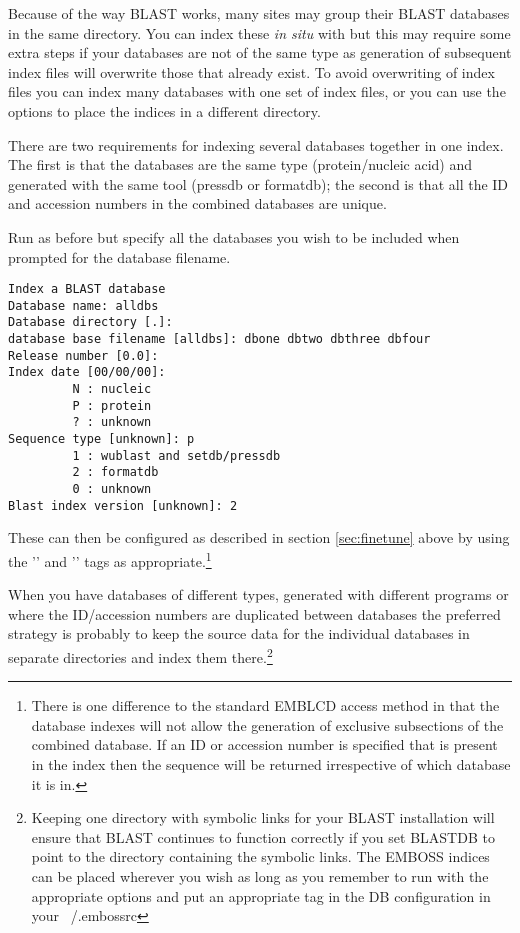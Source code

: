 \documentclass{report}
\begin{document}
Because of the way BLAST works, many sites may group their BLAST databases in the same directory. You can index these {\it in situ} with  but this may require some extra steps if your databases are not of the same type as generation of subsequent index files will overwrite those that already exist. To avoid overwriting of index files you can index many databases with one set of index files, or you can use the  options to place the indices in a different directory.

There are two requirements for indexing several databases together in one index. The first is that the databases are the same type (protein/nucleic acid) and generated with the same tool (pressdb or formatdb); the second is that all the ID and accession numbers in the combined databases are unique.

Run  as before but specify all the databases you wish to be included when prompted for the database filename.

\begin{verbatim}
Index a BLAST database
Database name: alldbs
Database directory [.]: 
database base filename [alldbs]: dbone dbtwo dbthree dbfour 
Release number [0.0]: 
Index date [00/00/00]: 
         N : nucleic
         P : protein
         ? : unknown
Sequence type [unknown]: p
         1 : wublast and setdb/pressdb
         2 : formatdb
         0 : unknown
Blast index version [unknown]: 2

\end{verbatim}

These can then be configured as described in section \ref{sec:finetune} above by using the '' and '' tags as appropriate.\footnote{There is one difference to the standard EMBLCD access method in that the database indexes will not allow the generation of exclusive subsections of the combined database. If an ID or accession number is specified that is present in the index then the sequence will be returned irrespective of which database it is in.}

When you have databases of different types, generated with different programs or where the ID/accession numbers are duplicated between databases the preferred strategy is probably to keep the source data for the individual databases in separate directories and index them there.\footnote{Keeping one directory with symbolic links for your BLAST installation will ensure that BLAST continues to function correctly if you set BLASTDB to point to the directory containing the symbolic links. The EMBOSS indices can be placed wherever you wish as long as you remember to run  with the appropriate options and put an appropriate  tag in the DB configuration in your ~/.embossrc}
\end{document}
